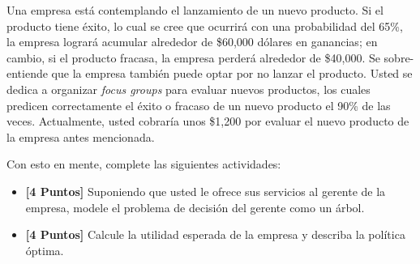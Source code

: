 \documentclass[ a4paper, twoside, 11pt]{article}
\begin{document}
\begin{problem}
Una empresa est\'a contemplando el lanzamiento de un nuevo producto. Si el producto tiene \'exito, lo cual se cree que ocurrir\'a con una probabilidad del 65\%, la empresa lograr\'a acumular alrededor de \$60,000 d\'olares en ganancias; en cambio, si el producto fracasa, la empresa perder\'a alrededor de \$40,000. Se sobre-entiende que la empresa tambi\'en puede optar por no lanzar el producto. Usted se dedica a organizar \emph{focus groups} para evaluar nuevos productos, los cuales predicen correctamente el \'exito o fracaso de un nuevo producto el 90\% de las veces. Actualmente, usted cobrar\'ia unos \$1,200 por evaluar el nuevo producto de la empresa antes mencionada. 

Con esto en mente, complete las siguientes actividades: 
\begin{itemize}
\item \textbf{[4 Puntos]} Suponiendo que usted le ofrece sus servicios al gerente de la empresa, modele el problema de decisi\'on del gerente como un \'arbol. 
\item \textbf{[4 Puntos]} Calcule la utilidad esperada de la empresa y describa la pol\'itica \'optima. 
\end{itemize}


\end{problem}
\end{document}
